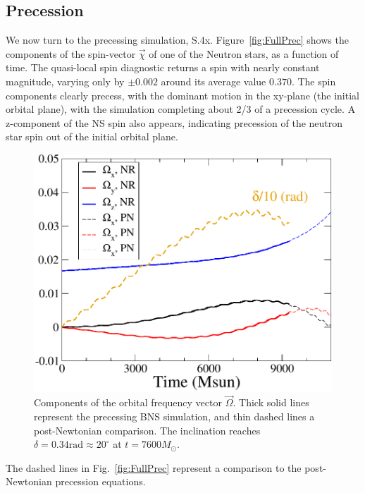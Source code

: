 \documentclass[aps,prd,amsmath,floatfix
,twocolumn
,superscriptaddress,nofootinbib,showpacs]{revtex4-1}
\theoremstyle{plain} \newtheorem{thm}{Theorem} \newtheorem{lem}{Lemma}
\begin{document}
\subsection{Precession}


We now turn to the precessing simulation, S.4x.
Figure~\ref{fig:FullPrec} shows the components of the spin-vector
$\vec\chi$ of one of the Neutron stars, as a function of time.  The
quasi-local spin diagnostic returns a spin with nearly constant
magnitude, varying only by $\pm 0.002$ around its average value
$0.370$.  The spin components clearly precess, with the dominant
motion in the xy-plane (the initial orbital plane), with the
simulation completing about 2/3 of a precession cycle.  A z-component
of the NS spin also appears, indicating precession of the neutron star
spin out of the initial orbital plane.

\begin{figure}
\includegraphics[width=0.95\columnwidth]{OmegaVectorComparison}
  \caption{\label{fig:OmegaVectorComparison} Components of the orbital frequency vector $\vec\Omega$.  Thick solid lines represent the precessing BNS simulation, and thin dashed lines a post-Newtonian comparison.  The inclination reaches $\delta=0.34\mbox{rad}\approx 20^\circ$ at $t=7600 M_\odot$.
  }
\end{figure}


The dashed lines in Fig.~\ref{fig:FullPrec} represent a comparison to
the post-Newtonian precession equations. 
\end{document}
